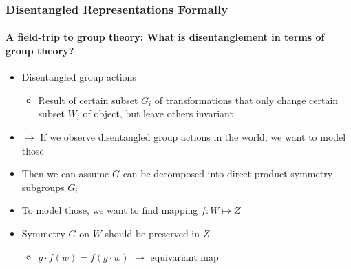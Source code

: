 \documentclass[9pt]{beamer}
\begin{document}
\begin{frame}
\frametitle{Disentangled Representations Formally}
\framesubtitle{A field-trip to group theory: What is disentanglement in terms of group theory?}
\begin{itemize}%
	\item Disentangled group actions
	\begin{itemize}
		\item Result of certain subset $G_i$ of transformations that only change certain subset $W_i$ of object, but leave others invariant
	\end{itemize}
	\item $\rightarrow$ If we observe disentangled group actions in the world, we want to model those
	\item Then we can assume $G$ can be decomposed into direct product symmetry subgroups $G_i$
	\item To model those, we want to find mapping $f:W \mapsto Z$
	\item Symmetry $G$ on $W$ should be preserved in $Z$%
	\begin{itemize}
		\item $g \cdot f(w) = f(g\cdot w)$ $\rightarrow$ equivariant map
	\end{itemize}
\end{itemize}
\end{frame} 
\end{document}
